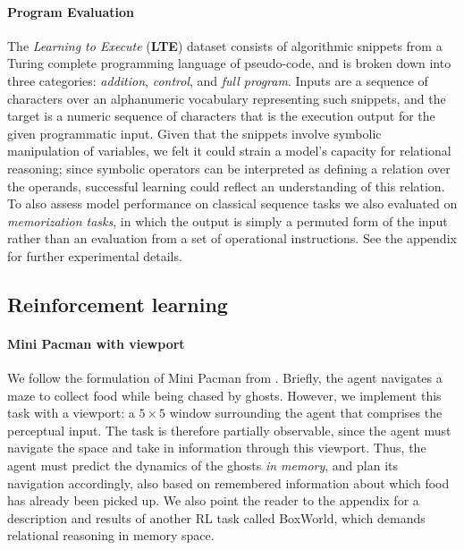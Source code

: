 \documentclass{article}
\begin{document}
\paragraph{Program Evaluation}
The \textit{Learning to Execute} (\textbf{LTE}) dataset \cite{zaremba2014lte} consists of algorithmic snippets from a Turing complete programming language of pseudo-code, and is broken down into three categories: \textit{addition}, \textit{control}, and \textit{full program}. Inputs are a sequence of characters over an alphanumeric vocabulary representing such snippets, and the target is a numeric sequence of characters that is the execution output for the given programmatic input. Given that the snippets involve symbolic manipulation of variables, we felt it could strain a model's capacity for relational reasoning; since symbolic operators can be interpreted as defining a relation over the operands, successful learning could reflect an understanding of this relation. To also assess model performance on classical sequence tasks we also evaluated on \textit{memorization tasks}, in which the output is simply a permuted form of the input rather than an evaluation from a set of operational instructions.  See the appendix for further experimental details.

\subsection{Reinforcement learning}

\paragraph{Mini Pacman with viewport} We follow the formulation of Mini Pacman from \cite{weber2017imagination}. Briefly, the agent navigates a maze to collect food while being chased by ghosts. However, we implement this task with a viewport: a $5 \times 5$ window surrounding the agent that comprises the perceptual input. The task is therefore partially observable, since the agent must navigate the space and take in information through this viewport. Thus, the agent must predict the dynamics of the ghosts \textit{in memory}, and plan its navigation accordingly, also based on remembered information about which food has already been picked up. We also point the reader to the appendix for a description and results of another RL task called BoxWorld, which demands relational reasoning in memory space.
\end{document}
